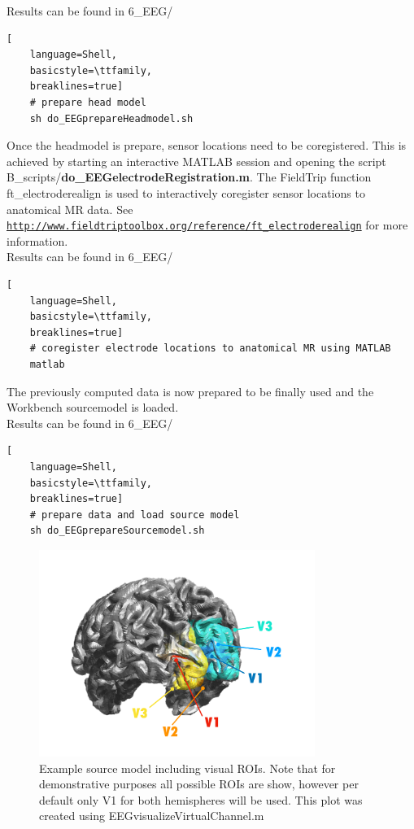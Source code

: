 \documentclass[12pt,a4paper]{scrartcl}
\begin{document}
\noindent Results can be found in 6\_EEG/\\
\begin{lstlisting}[
    language=Shell,
    basicstyle=\ttfamily,
    breaklines=true]
    # prepare head model
    sh do_EEGprepareHeadmodel.sh
\end{lstlisting}
Once the headmodel is prepare, sensor locations need to be coregistered. This is achieved by starting an interactive MATLAB session and opening the script B\_scripts/\textbf{do\_EEGelectrodeRegistration.m}. The FieldTrip function ft\_electroderealign is used to interactively coregister sensor locations to anatomical MR data. See \href{http://www.fieldtriptoolbox.org/reference/ft\_electroderealign}{\nolinkurl{http://www.fieldtriptoolbox.org/reference/ft\_electroderealign}} for more information.\\

\noindent Results can be found in 6\_EEG/\\
\begin{lstlisting}[
    language=Shell,
    basicstyle=\ttfamily,
    breaklines=true]
    # coregister electrode locations to anatomical MR using MATLAB
    matlab
\end{lstlisting}
The previously computed data is now prepared to be finally used and the Workbench sourcemodel is loaded.\\

\noindent Results can be found in 6\_EEG/\\
\begin{lstlisting}[
    language=Shell,
    basicstyle=\ttfamily,
    breaklines=true]
    # prepare data and load source model
    sh do_EEGprepareSourcemodel.sh
\end{lstlisting}
\begin{figure}
\begin{center}
\includegraphics[width=0.8\textwidth]{exampleSourcemodel}
\caption[Example source model]{Example source model including visual ROIs. Note that for demonstrative purposes all possible ROIs are show, however per default only V1 for both hemispheres will be used. This plot was created using EEGvisualizeVirtualChannel.m}
\end{center}
\label{fig:exampleSourcemodel}
\end{figure}
\FloatBarrier
\end{document}
